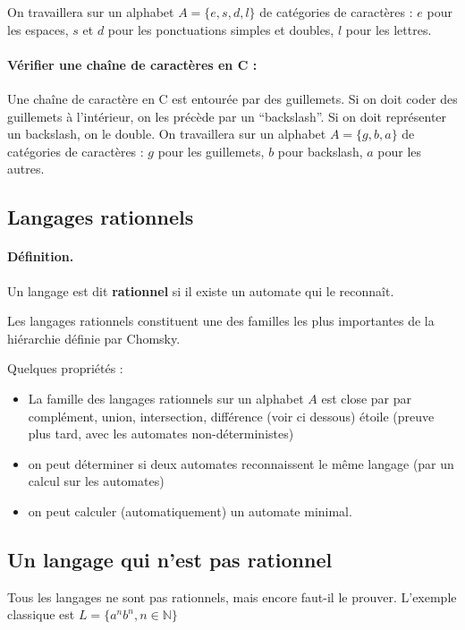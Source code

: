 \documentclass[10pt,twoside]{article}
\begin{document}
On travaillera sur un alphabet $A=\{e, s, d, l\}$ de catégories de caractères : 
$e$ pour les espaces, $s$ et $d$ pour les ponctuations simples et doubles, $l$ pour les lettres.


\paragraph{Vérifier une chaîne de caractères en C : } Une chaîne 
de caractère en C est entourée
par des guillemets. Si on doit coder des guillemets à l'intérieur, on
les précède par un ``backslash''.  Si on doit représenter un
backslash, on le double.  On travaillera sur un 
alphabet $A=\{g, b, a\}$ de catégories de caractères : $g$ pour les guillemets, $b$ pour
backslash, $a$ pour les autres.



\subsection{Langages rationnels}

\paragraph{Définition. } Un langage est dit \textbf{rationnel} si il existe
un automate qui le reconnaît.

Les langages rationnels constituent une des familles les plus importantes
de la hiérarchie définie par Chomsky.

Quelques propriétés :
\begin{itemize}
\item La famille des langages rationnels sur un alphabet $A$ est close
  par par complément, union, intersection, différence (voir ci
  dessous) étoile (preuve plus tard, avec les automates
  non-déterministes)
\item on peut déterminer si deux automates reconnaissent le même langage
(par un calcul sur les automates)
\item on peut calculer  (automatiquement)
un automate minimal.
\end{itemize}

\subsection{Un langage qui n'est pas rationnel}

Tous les langages ne sont pas rationnels, mais encore faut-il le prouver.
L'exemple classique est  $L = \{ a^n b^n, n \in \mathbb{N} \}$
\end{document}
